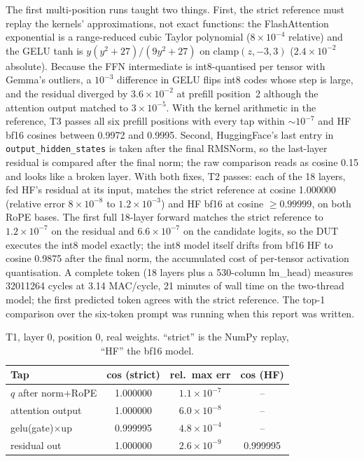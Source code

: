 \documentclass[10pt,twocolumn]{article}
\begin{document}
The first multi-position runs taught two things. First, the strict reference
must replay the kernels' approximations, not exact functions: the
FlashAttention exponential is a range-reduced cubic Taylor polynomial
($8\times10^{-4}$ relative) and the GELU tanh is $y(y^2+27)/(9y^2+27)$ on
$\mathrm{clamp}(z,-3,3)$ ($2.4\times10^{-2}$ absolute). Because the FFN
intermediate is int8-quantised per tensor with Gemma's outliers, a
$10^{-3}$ difference in GELU flips int8 codes whose step is large, and the
residual diverged by $3.6\times10^{-2}$ at prefill position~2 although the
attention output matched to $3\times10^{-5}$. With the kernel arithmetic in
the reference, T3 passes all six prefill positions with every tap within
$\sim\!10^{-7}$ and HF bf16 cosines between 0.9972 and 0.9995. Second,
HuggingFace's last entry in \texttt{output\_hidden\_states} is taken after
the final RMSNorm, so the last-layer residual is compared after the final
norm; the raw comparison reads as cosine 0.15 and looks like a broken layer.
With both fixes, T2 passes: each of the 18 layers, fed HF's residual at its
input, matches the strict reference at cosine 1.000000 (relative error
$8\times10^{-8}$ to $1.2\times10^{-3}$) and HF bf16 at cosine $\geq 0.99999$,
on both RoPE bases. The first full 18-layer forward matches the strict
reference to $1.2\times10^{-7}$ on the residual and $6.6\times10^{-7}$ on the
candidate logits, so the DUT executes the int8 model exactly; the int8 model
itself drifts from bf16 HF to cosine 0.9875 after the final norm, the
accumulated cost of per-tensor activation quantisation. A complete token
(18 layers plus a 530-column lm\_head) measures \num{32011264} cycles at
3.14 MAC/cycle, 21 minutes of wall time on the two-thread model; the first
predicted token agrees with the strict reference. The top-1 comparison over
the six-token prompt was running when this report was written.

\begin{table}[t]
\centering\small
\caption{T1, layer 0, position 0, real weights. ``strict'' is the NumPy replay,
``HF'' the bf16 model.}
\label{tab:acc}
\begin{tabular}{lccc}
\toprule
Tap & cos (strict) & rel.\ max err & cos (HF) \\
\midrule
$q$ after norm+RoPE & 1.000000 & $1.1\times10^{-7}$ & -- \\
attention output & 1.000000 & $6.0\times10^{-8}$ & -- \\
gelu(gate)$\times$up & 0.999995 & $4.8\times10^{-4}$ & -- \\
residual out & 1.000000 & $2.6\times10^{-9}$ & 0.999995 \\
\bottomrule
\end{tabular}
\end{table}
\end{document}
